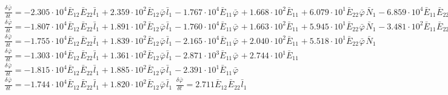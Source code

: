 $\frac{{\delta}^{} {\bar{\varphi}}_{}}{{\delta} {{{t}}_{}}^{}} = -2.305\cdot 10^{4}{{{\bar{E}}_{12}}^{}{{\bar{E}}_{22}}^{}{{\bar{l}}_{1}}^{}} + 2.359\cdot 10^{2}{{{\bar{E}}_{12}}^{}{{\bar{\varphi}}_{}}^{}{{\bar{l}}_{1}}^{}} - 1.767\cdot 10^{4}{{{\bar{E}}_{11}}^{}{{\bar{\varphi}}_{}}^{}} + 1.668\cdot 10^{2}{{{\bar{E}}_{11}}^{}} + 6.079\cdot 10^{1}{{{\bar{E}}_{22}}^{}{{\bar{\varphi}}_{}}^{}{{\bar{N}}_{1}}^{}} - 6.859\cdot 10^{4}{{{\bar{E}}_{11}}^{}{{\bar{E}}_{22}}^{}{{\bar{l}}_{1}}^{}} + 6.802\cdot 10^{2}{{{\bar{E}}_{22}}^{2}{{\bar{l}}_{1}}^{}}$
$\frac{{\delta}^{} {\bar{\varphi}}_{}}{{\delta} {{{t}}_{}}^{}} = -1.807\cdot 10^{4}{{{\bar{E}}_{12}}^{}{{\bar{E}}_{22}}^{}{{\bar{l}}_{1}}^{}} + 1.891\cdot 10^{2}{{{\bar{E}}_{12}}^{}{{\bar{\varphi}}_{}}^{}{{\bar{l}}_{1}}^{}} - 1.760\cdot 10^{4}{{{\bar{E}}_{11}}^{}{{\bar{\varphi}}_{}}^{}} + 1.663\cdot 10^{2}{{{\bar{E}}_{11}}^{}} + 5.945\cdot 10^{1}{{{\bar{E}}_{22}}^{}{{\bar{\varphi}}_{}}^{}{{\bar{N}}_{1}}^{}} - 3.481\cdot 10^{2}{{{\bar{E}}_{11}}^{}{{\bar{E}}_{22}}^{}{{\bar{l}}_{1}}^{}}$
$\frac{{\delta}^{} {\bar{\varphi}}_{}}{{\delta} {{{t}}_{}}^{}} = -1.755\cdot 10^{4}{{{\bar{E}}_{12}}^{}{{\bar{E}}_{22}}^{}{{\bar{l}}_{1}}^{}} + 1.839\cdot 10^{2}{{{\bar{E}}_{12}}^{}{{\bar{\varphi}}_{}}^{}{{\bar{l}}_{1}}^{}} - 2.165\cdot 10^{4}{{{\bar{E}}_{11}}^{}{{\bar{\varphi}}_{}}^{}} + 2.040\cdot 10^{2}{{{\bar{E}}_{11}}^{}} + 5.518\cdot 10^{1}{{{\bar{E}}_{22}}^{}{{\bar{\varphi}}_{}}^{}{{\bar{N}}_{1}}^{}}$
$\frac{{\delta}^{} {\bar{\varphi}}_{}}{{\delta} {{{t}}_{}}^{}} = -1.303\cdot 10^{4}{{{\bar{E}}_{12}}^{}{{\bar{E}}_{22}}^{}{{\bar{l}}_{1}}^{}} + 1.361\cdot 10^{2}{{{\bar{E}}_{12}}^{}{{\bar{\varphi}}_{}}^{}{{\bar{l}}_{1}}^{}} - 2.871\cdot 10^{3}{{{\bar{E}}_{11}}^{}{{\bar{\varphi}}_{}}^{}} + 2.744\cdot 10^{1}{{{\bar{E}}_{11}}^{}}$
$\frac{{\delta}^{} {\bar{\varphi}}_{}}{{\delta} {{{t}}_{}}^{}} = -1.815\cdot 10^{4}{{{\bar{E}}_{12}}^{}{{\bar{E}}_{22}}^{}{{\bar{l}}_{1}}^{}} + 1.885\cdot 10^{2}{{{\bar{E}}_{12}}^{}{{\bar{\varphi}}_{}}^{}{{\bar{l}}_{1}}^{}} - 2.391\cdot 10^{1}{{{\bar{E}}_{11}}^{}{{\bar{\varphi}}_{}}^{}}$
$\frac{{\delta}^{} {\bar{\varphi}}_{}}{{\delta} {{{t}}_{}}^{}} = -1.744\cdot 10^{4}{{{\bar{E}}_{12}}^{}{{\bar{E}}_{22}}^{}{{\bar{l}}_{1}}^{}} + 1.820\cdot 10^{2}{{{\bar{E}}_{12}}^{}{{\bar{\varphi}}_{}}^{}{{\bar{l}}_{1}}^{}}$
$\frac{{\delta}^{} {\bar{\varphi}}_{}}{{\delta} {{{t}}_{}}^{}} = 2.711{{{\bar{E}}_{12}}^{}{{\bar{E}}_{22}}^{}{{\bar{l}}_{1}}^{}}$
